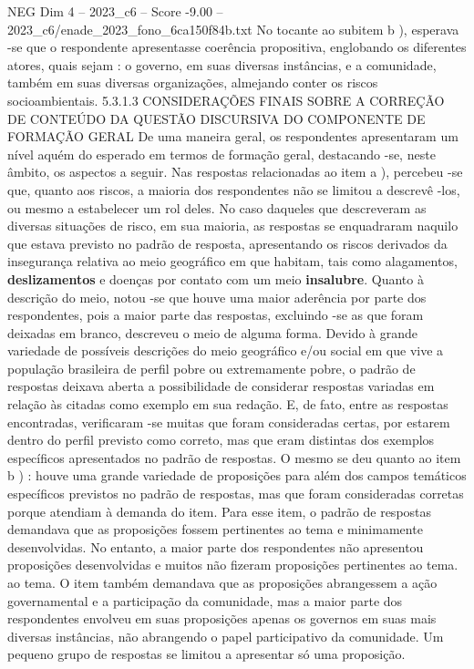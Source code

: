 \begin{textsample}{NEG Dim 4 – 2023\_c6 – Score -9.00 – 2023\_c6/enade\_2023\_fono\_6ca150f84b.txt}
No tocante ao subitem b ), esperava -se que o respondente apresentasse coerência propositiva, englobando os diferentes atores, quais sejam : o governo, em suas diversas instâncias, e a comunidade, também em suas diversas organizações, almejando conter os riscos socioambientais. 5.3.1.3 CONSIDERAÇÕES FINAIS SOBRE A CORREÇÃO DE CONTEÚDO DA QUESTÃO DISCURSIVA DO COMPONENTE DE FORMAÇÃO GERAL De uma maneira geral, os respondentes apresentaram um nível aquém do esperado em termos de formação geral, destacando -se, neste âmbito, os aspectos a seguir.
Nas respostas relacionadas ao item a ), percebeu -se que, quanto aos riscos, a maioria dos respondentes não se limitou a descrevê -los, ou mesmo a estabelecer um rol deles.
No caso daqueles que descreveram as diversas situações de risco, em sua maioria, as respostas se enquadraram naquilo que estava previsto no padrão de resposta, apresentando os riscos derivados da insegurança relativa ao meio geográfico em que habitam, tais como alagamentos, \textbf{deslizamentos} e doenças por contato com um meio \textbf{insalubre}.
Quanto à descrição do meio, notou -se que houve uma maior aderência por parte dos respondentes, pois a maior parte das respostas, excluindo -se as que foram deixadas em branco, descreveu o meio de alguma forma.
Devido à grande variedade de possíveis descrições do meio geográfico e/ou social em que vive a população brasileira de perfil pobre ou extremamente pobre, o padrão de respostas deixava aberta a possibilidade de considerar respostas variadas em relação às citadas como exemplo em sua redação.
E, de fato, entre as respostas encontradas, verificaram -se muitas que foram consideradas certas, por estarem dentro do perfil previsto como correto, mas que eram distintas dos exemplos específicos apresentados no padrão de respostas.
O mesmo se deu quanto ao item b ) : houve uma grande variedade de proposições para além dos campos temáticos específicos previstos no padrão de respostas, mas que foram consideradas corretas porque atendiam à demanda do item.
Para esse item, o padrão de respostas demandava que as proposições fossem pertinentes ao tema e minimamente desenvolvidas.
No entanto, a maior parte dos respondentes não apresentou proposições desenvolvidas e muitos não fizeram proposições pertinentes ao tema. ao tema.
O item também demandava que as proposições abrangessem a ação governamental e a participação da comunidade, mas a maior parte dos respondentes envolveu em suas proposições apenas os governos em suas mais diversas instâncias, não abrangendo o papel participativo da comunidade.
Um pequeno grupo de respostas se limitou a apresentar só uma proposição.

\end{textsample}
